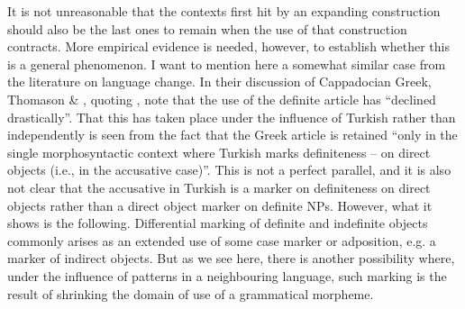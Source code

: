\begin{styleBodytextC}
It is not unreasonable that the contexts first hit by an expanding construction should also be the last ones to remain when the use of that construction contracts. More empirical evidence is needed, however, to establish whether this is a general phenomenon. I want to mention here a somewhat similar case from the literature on language change. In their discussion of Cappadocian Greek, Thomason \& \citet{Kaufman1988}, quoting \citet{Dawkins1916}, note that the use of the definite article has “declined drastically”. That this has taken place under the influence of Turkish rather than independently is seen from the fact that the Greek article is retained “only in the single morphosyntactic context where Turkish marks definiteness – on direct objects (i.e., in the accusative case)”. This is not a perfect parallel, and it is also not clear that the accusative in Turkish is a marker on definiteness on direct objects rather than a direct object marker on definite NPs. However, what it shows is the following. Differential marking of definite and indefinite objects commonly arises as an extended use of some case marker or adposition, e.g. a marker of indirect objects. But as we see here, there is another possibility where, under the influence of patterns in a neighbouring language, such marking is the result of shrinking the domain of use of a grammatical morpheme. 

\end{styleBodytextC}

